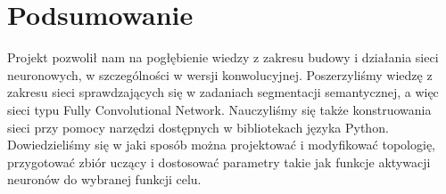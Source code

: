 \documentclass{article}
\begin{document}
\section{Podsumowanie}

Projekt pozwolił nam na pogłębienie wiedzy z zakresu budowy i działania sieci neuronowych, w szczególności w wersji konwolucyjnej. Poszerzyliśmy wiedzę z zakresu sieci sprawdzających się w zadaniach segmentacji semantycznej, a więc sieci typu Fully Convolutional Network. Nauczyliśmy się także konstruowania sieci przy pomocy narzędzi dostępnych w bibliotekach języka Python. Dowiedzieliśmy się w jaki sposób można projektować i modyfikować topologię, przygotować zbiór uczący i dostosować parametry takie jak funkcje aktywacji neuronów do wybranej funkcji celu.

\clearpage %








\end{document}
